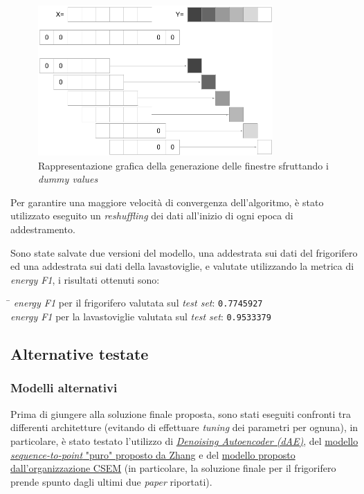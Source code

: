 \documentclass[12pt,a4paper,fleqn]{article}
\begin{document}
\begin{figure}
\centering
\includegraphics[width=0.8\textwidth]{images/padding.png}
\caption{Rappresentazione grafica della generazione delle finestre sfruttando i \textsl{dummy values}}
\label{fig:padding}
\end{figure}

Per garantire una maggiore velocità di convergenza dell'algoritmo, è stato utilizzato eseguito un \textsl{reshuffling} dei dati all'inizio di ogni epoca di addestramento.

Sono state salvate due versioni del modello, una addestrata sui dati del frigorifero ed una addestrata sui dati della lavastoviglie, e valutate utilizzando la metrica di \textsl{energy F1}, i risultati ottenuti sono:

\begin{tabbing}
\hspace{3.75in}     \= \hspace{1.00in}		\kill
\textsl{energy F1} per il frigorifero valutata sul \textsl{test set}: \> \texttt{0.7745927}\\
\textsl{energy F1} per la lavastoviglie valutata sul \textsl{test set}: \> \texttt{0.9533379}
\end{tabbing}

\subsection{Alternative testate}

\subsubsection{Modelli alternativi}
Prima di giungere alla soluzione finale proposta, sono stati eseguiti confronti tra differenti architetture (evitando di effettuare \textsl{tuning} dei parametri per ognuna), in particolare, è stato testato l'utilizzo di \href{https://arxiv.org/abs/1507.06594}{\textsl{Denoising Autoencoder (dAE)}}, del \href{https://arxiv.org/abs/1612.09106}{modello \textsl{sequence-to-point} "puro" proposto da Zhang} e del \href{http://nilmworkshop.org/2018/proceedings/Poster_ID20.pdf}{modello proposto dall'organizzazione CSEM} (in particolare, la soluzione finale per il frigorifero prende spunto dagli ultimi due \textsl{paper} riportati).
\end{document}
